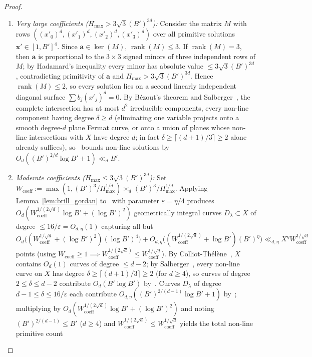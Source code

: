\documentclass[11pt,a4paper]{amsart}
\theoremstyle{plain}
\theoremstyle{definition}
\theoremstyle{remark}
\DeclareMathOperator{\rank}{rank}
\begin{document}
\begin{proof}
\begin{itemize}[itemsep=2pt]
\begin{enumerate}[label=(\alph*),itemsep=1pt]
\item \emph{Very large coefficients ($H_{\max} > 3\sqrt{3}(B')^{3d}$):} Consider the matrix $M$ with rows $((x'_0)^d, (x'_1)^d, (x'_2)^d, (x'_3)^d)$ over all primitive solutions $\mathbf{x}' \in [1, B']^4$. Since $\mathbf{a} \in \ker(M)$, $\rank(M) \le 3$. If $\rank(M) = 3$, then $\mathbf{a}$ is proportional to the $3 \times 3$ signed minors of three independent rows of $M$; by Hadamard's inequality every minor has absolute value $\le 3\sqrt{3}(B')^{3d}$, contradicting primitivity of $\mathbf{a}$ and $H_{\max} > 3\sqrt{3}(B')^{3d}$. Hence $\rank(M) \le 2$, so every solution lies on a second linearly independent diagonal surface $\sum b_j (x'_j)^d = 0$. By B\'ezout's theorem and Salberger~\cite[Theorem~9.4(b)]{Salberger2023}, the complete intersection has at most $d^2$ irreducible components, every non-line component having degree $\delta \ge d$ (eliminating one variable projects onto a smooth degree-$d$ plane Fermat curve, or onto a union of planes whose non-line intersections with $X$ have degree $d$; in fact $\delta \ge \lceil(d+1)/3\rceil \ge 2$ alone already suffices), so~\cite[Theorem~1.17]{Salberger2023} bounds non-line solutions by $O_d((B')^{2/d}\log B' + 1) \ll_d B'$.
\item \emph{Moderate coefficients ($H_{\max} \le 3\sqrt{3}(B')^{3d}$):} Set $W_{\mathrm{coeff}} := \max(1, (B')^3/H_{\max}^{1/d}) \asymp_d (B')^3/H_{\max}^{1/d}$. Applying Lemma~\ref{lem:brill_gordan} to~\cite[Theorem~3.16]{Salberger2023} with parameter $\varepsilon = \eta / 4$ produces $O_d(W_{\mathrm{coeff}}^{1/(2\sqrt{d})} \log B' + (\log B')^2)$ geometrically integral curves $D_\lambda \subset X$ of degree $\le 16/\varepsilon = O_{d,\eta}(1)$ capturing all but
\[
  O_d\bigl((W_{\mathrm{coeff}}^{1/\sqrt{d}} + (\log B')^2) (\log B')^4\bigr) + O_{d,\eta}\bigl((W_{\mathrm{coeff}}^{1/(2\sqrt{d})} + \log B') (B')^\eta\bigr)
  \ll_{d,\eta} X^\eta W_{\mathrm{coeff}}^{1/\sqrt{d}}
\]
points (using $W_{\mathrm{coeff}} \ge 1 \implies W_{\mathrm{coeff}}^{1/(2\sqrt{d})} \le W_{\mathrm{coeff}}^{1/\sqrt{d}}$). By Colliot-Th\'el\`ene~\cite{ColliotThelene2002}, $X$ contains $O_d(1)$ curves of degree $\le d - 2$; by Salberger~\cite[Theorem~9.4(b)]{Salberger2023}, every non-line curve on $X$ has degree $\delta \ge \lceil(d+1)/3\rceil \ge 2$ (for $d \ge 4$), so curves of degree $2 \le \delta \le d - 2$ contribute $O_d(B' \log B')$ by~\cite[Theorem~1.17]{Salberger2023}. Curves $D_\lambda$ of degree $d - 1 \le \delta \le 16/\varepsilon$ each contribute $O_{d,\eta}((B')^{2/(d-1)}\log B' + 1)$ by~\cite[Theorem~1.17]{Salberger2023}; multiplying by $O_d(W_{\mathrm{coeff}}^{1/(2\sqrt{d})} \log B' + (\log B')^2)$ and noting $(B')^{2/(d-1)} \le B'$ ($d \ge 4$) and $W_{\mathrm{coeff}}^{1/(2\sqrt{d})} \le W_{\mathrm{coeff}}^{1/\sqrt{d}}$ yields the total non-line primitive count

\end{enumerate}
\end{itemize}
\end{proof}
\end{document}
